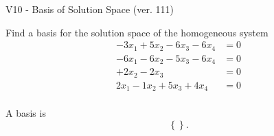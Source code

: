 \begin{exercise}
  \begin{exerciseTitle}V10 - Basis of Solution Space (ver. 111)\end{exerciseTitle}
  \begin{exerciseStatement}
    Find a basis for the solution space of the homogeneous system 
\begin{align*}
 -3 x_ 1 + 5 x_ 2 -6 x_ 3 -6 x_ 4 &= 0  \\ 
  -6 x_ 1 -6 x_ 2 -5 x_ 3 -6 x_ 4 &= 0  \\ 
  + 2 x_ 2 -2 x_ 3 &= 0  \\ 
  2 x_ 1 -1 x_ 2 + 5 x_ 3 + 4 x_ 4 &= 0  \\ 
 \end{align*}


 
  \end{exerciseStatement}

  \begin{exerciseAnswer}
   A basis is   
\[\left\{\right\}.\]

  


  \end{exerciseAnswer}
\end{exercise}